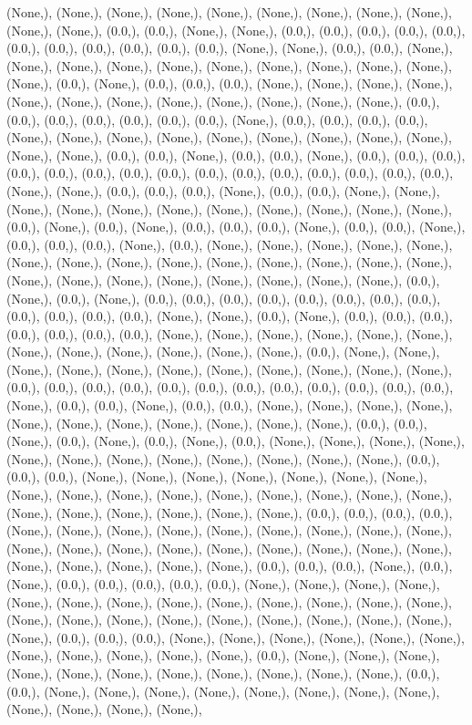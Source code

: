 \documentclass{article}
\begin{document}
(None,), (None,), (None,), (None,), (None,), (None,), (None,), (None,), (None,), (None,), (None,), (0.0,), (0.0,), (None,), (None,), (0.0,), (0.0,), (0.0,), (0.0,), (0.0,), (0.0,), (0.0,), (0.0,), (0.0,), (0.0,), (0.0,), (None,), (None,), (0.0,), (0.0,), (None,), (None,), (None,), (None,), (None,), (None,), (None,), (None,), (None,), (None,), (None,), (0.0,), (None,), (0.0,), (0.0,), (0.0,), (None,), (None,), (None,), (None,), (None,), (None,), (None,), (None,), (None,), (None,), (None,), (None,), (0.0,), (0.0,), (0.0,), (0.0,), (0.0,), (0.0,), (0.0,), (None,), (0.0,), (0.0,), (0.0,), (0.0,), (None,), (None,), (None,), (None,), (None,), (None,), (None,), (None,), (None,), (None,), (None,), (0.0,), (0.0,), (None,), (0.0,), (0.0,), (None,), (0.0,), (0.0,), (0.0,), (0.0,), (0.0,), (0.0,), (0.0,), (0.0,), (0.0,), (0.0,), (0.0,), (0.0,), (0.0,), (0.0,), (0.0,), (None,), (None,), (0.0,), (0.0,), (0.0,), (None,), (0.0,), (0.0,), (None,), (None,), (None,), (None,), (None,), (None,), (None,), (None,), (None,), (None,), (None,), (0.0,), (None,), (0.0,), (None,), (0.0,), (0.0,), (0.0,), (None,), (0.0,), (0.0,), (None,), (0.0,), (0.0,), (0.0,), (None,), (0.0,), (None,), (None,), (None,), (None,), (None,), (None,), (None,), (None,), (None,), (None,), (None,), (None,), (None,), (None,), (None,), (None,), (None,), (None,), (None,), (None,), (None,), (None,), (0.0,), (None,), (0.0,), (None,), (0.0,), (0.0,), (0.0,), (0.0,), (0.0,), (0.0,), (0.0,), (0.0,), (0.0,), (0.0,), (0.0,), (0.0,), (None,), (None,), (0.0,), (None,), (0.0,), (0.0,), (0.0,), (0.0,), (0.0,), (0.0,), (0.0,), (None,), (None,), (None,), (None,), (None,), (None,), (None,), (None,), (None,), (None,), (None,), (None,), (0.0,), (None,), (None,), (None,), (None,), (None,), (None,), (None,), (None,), (None,), (None,), (None,), (0.0,), (0.0,), (0.0,), (0.0,), (0.0,), (0.0,), (0.0,), (0.0,), (0.0,), (0.0,), (0.0,), (0.0,), (None,), (0.0,), (0.0,), (None,), (0.0,), (0.0,), (None,), (None,), (None,), (None,), (None,), (None,), (None,), (None,), (None,), (None,), (None,), (0.0,), (0.0,), (None,), (0.0,), (None,), (0.0,), (None,), (0.0,), (None,), (None,), (None,), (None,), (None,), (None,), (None,), (None,), (None,), (None,), (None,), (None,), (0.0,), (0.0,), (0.0,), (None,), (None,), (None,), (None,), (None,), (None,), (None,), (None,), (None,), (None,), (None,), (None,), (None,), (None,), (None,), (None,), (None,), (None,), (None,), (None,), (None,), (None,), (0.0,), (0.0,), (0.0,), (0.0,), (None,), (None,), (None,), (None,), (None,), (None,), (None,), (None,), (None,), (None,), (None,), (None,), (None,), (None,), (None,), (None,), (None,), (None,), (None,), (None,), (None,), (None,), (None,), (0.0,), (0.0,), (0.0,), (None,), (0.0,), (None,), (0.0,), (0.0,), (0.0,), (0.0,), (0.0,), (None,), (None,), (None,), (None,), (None,), (None,), (None,), (None,), (None,), (None,), (None,), (None,), (None,), (None,), (None,), (None,), (None,), (None,), (None,), (None,), (None,), (None,), (None,), (0.0,), (0.0,), (0.0,), (None,), (None,), (None,), (None,), (None,), (None,), (None,), (None,), (None,), (None,), (None,), (0.0,), (None,), (None,), (None,), (None,), (None,), (None,), (None,), (None,), (None,), (None,), (None,), (0.0,), (0.0,), (None,), (None,), (None,), (None,), (None,), (None,), (None,), (None,), (None,), (None,), (None,), (None,), 
\end{document}
